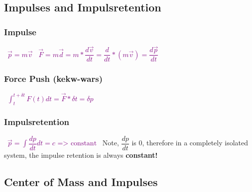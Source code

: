 \documentclass[main.tex,fontsize=8pt,paper=a4,paper=portrait,DIV=calc,]{scrartcl}
\begin{document}
\begin{multicols*}{2}
\subsection{Impulses and Impulsretention}
\subsubsection{Impulse}
\, \newline
\large \textcolor{purple}{\( \vec{p} = m\vec{v} \)}\newline
\, \newline
\textcolor{purple}{\( \vec{F} = m\vec{d} = m * \dfrac{d\vec{v}}{dt} = \dfrac{d}{dt} * (m\vec{v}) = \dfrac{d\vec{p}}{dt} \)}\newline
\normalsize \, \newline

\subsubsection{Force Push (kekw-wars)}
\, \newline
\large \textcolor{purple}{ \(\int^{t+\delta t}_{t} F(t) dt = \vec{F}* \delta t = \delta p\)}\newline
\normalsize \, \newline

\subsubsection{Impulsretention}
\, \newline
\large \textcolor{purple}{ \( \vec{p} = \int \dfrac{dp}{dt} dt = c \text{ => constant}\)}\newline
\Large \, \newline
Note, \(\dfrac{dp}{dt}\) is 0, therefore in a completely isolated system, the impulse retention is always \textbf{constant!} \normalsize \newline


\subsection{Center of Mass and Impulses} 

\end{multicols*}
\end{document}
